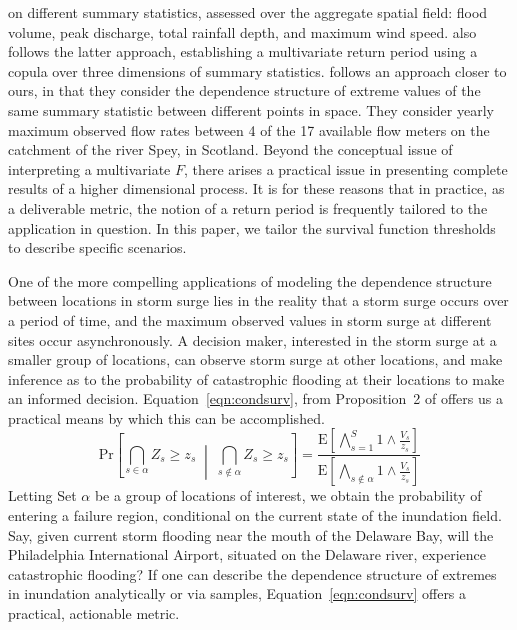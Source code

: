     on different summary statistics, assessed over the aggregate spatial field: flood volume, 
    peak discharge, total rainfall depth, and maximum wind speed.  \cite{graler2013} also follows the latter 
    approach, establishing a multivariate return period using a copula over three dimensions of summary statistics.
    \cite{salvadori2010} follows an approach closer to ours, in that they consider the dependence 
    structure of extreme values of the same summary statistic between different points in space.  They
    consider yearly maximum observed flow rates between 4 of the 17 available flow meters on the catchment 
    of the river Spey, in Scotland.  
    Beyond the conceptual issue of interpreting a multivariate $F$, there arises a practical issue in presenting
    complete results of a higher dimensional process.
    It is for these reasons that in practice, as a deliverable metric, the notion of a return period is
    frequently tailored to the application in question.  In this paper, we tailor the survival function
    thresholds to describe specific scenarios. 

One of the more compelling applications of modeling the dependence structure between locations in 
    storm surge lies in the reality that a storm surge occurs over a period of time, and the 
    maximum observed values in storm surge at different sites occur asynchronously.  A decision maker,
    interested in the storm surge at a smaller group of locations, can observe storm surge at other
    locations, and make inference as to the probability of catastrophic flooding at their locations
    to make an informed decision.
    Equation~\eqref{eqn:condsurv}, from Proposition~2 of \cite{trubey:pg} offers us a practical means
    by which this can be accomplished.
    \begin{equation}
        \label{eqn:condsurv}
        \text{Pr}\left[\bigcap_{s\in\alpha}Z_s \geq z_s\;\middle|\;\bigcap_{s\not\in\alpha}Z_s \geq z_s\right] =
        \frac{
            \text{E}\left[\bigwedge_{s=1}^S 1\wedge \frac{V_s}{z_s}\right]
        }{
            \text{E}\left[\bigwedge_{s\not\in\alpha} 1\wedge \frac{V_s}{z_s}\right]
        }
    \end{equation}
    Letting Set $\alpha$ be a group of locations of interest, we obtain the probability of
    entering a failure region, conditional on the current state of the inundation field.  
    Say, given current storm flooding near the mouth of the Delaware Bay, will the 
    Philadelphia International Airport, situated on the Delaware river, experience catastrophic flooding?  
    If one can describe the dependence structure of extremes in inundation analytically or via samples,
    Equation~\ref{eqn:condsurv} offers a practical, actionable metric.

